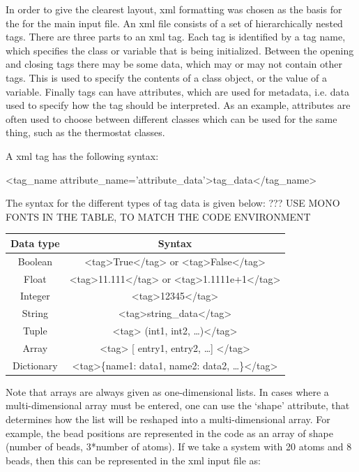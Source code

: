 \documentclass[11pt,english,fleqn]{report}
\newenvironment{code}{%
\footnotesize 
\verbatim
}{
\endverbatim
\normalsize
}
\begin{document}
\label{ifilestructure}

In order to give the clearest layout, xml formatting was chosen as
the basis for the for the main input file. An xml file consists of
a set of hierarchically nested tags. There are three parts to an xml
tag. Each tag is identified by a tag name, which specifies the class
or variable that is being initialized. Between the opening and closing
tags there may be some data, which may or may not contain other tags.
This is used to specify the contents of a class object,
or the value of a variable. Finally tags can have attributes,
which are used for metadata, i.e. data used to specify
how the tag should be interpreted. As an example, attributes
are often used to choose between different classes which can
be used for the same thing, such as the thermostat classes. 

A xml tag has the following syntax:

\begin{code}
<tag_name attribute_name='attribute_data'>tag_data</tag_name>
\end{code}

The syntax for the different types of tag data is given below: 
{\color{red}??? USE MONO FONTS IN THE TABLE, TO MATCH THE CODE ENVIRONMENT}

\begin{center}
\begin{tabular}{cc}
\hline\hline
Data type & Syntax\\
\hline 
Boolean & <tag>True</tag> or <tag>False</tag>\\
Float & <tag>11.111</tag> or <tag>1.1111e+1</tag>\\
Integer & <tag>12345</tag>\\
String & <tag>string\_data</tag>\\
Tuple & <tag> (int1, int2, \ldots )</tag>\\
Array & <tag> {[} entry1, entry2, \ldots {]} </tag>\\
Dictionary & <tag>\{name1: data1, name2: data2, \ldots \}</tag>\\
\hline\hline
\end{tabular}
\end{center}

Note that arrays are always given as one-dimensional lists. In cases
where a multi-dimensional array must be entered, one can use the `shape'
attribute, that determines how the list will be reshaped into a multi-dimensional
array. For example, the bead positions are
represented in the code as an array of shape 
(number of beads, 3*number of atoms). If we take a system with 20 atoms
and 8 beads, then this can be represented in the xml input file as:
\end{document}
